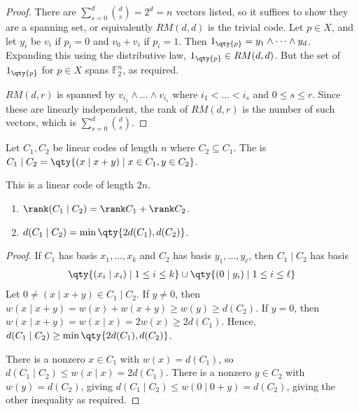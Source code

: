 \begin{proof}
    There are $\sum_{s=0}^d \binom{d}{s} = 2^d = n$ vectors listed, so it suffices to show they are a spanning set, or equivalently $RM(d,d)$ is the trivial code.
    Let $p \in X$, and let $y_i$ be $v_i$ if $p_i = 0$ and $v_0 + v_i$ if $p_i = 1$.
    Then $1_{\qty{p}} = y_1 \wedge \dots \wedge y_d$.
    Expanding this using the distributive law, $1_{\qty{p}} \in RM(d,d)$.
    But the set of $1_{\qty{p}}$ for $p \in X$ spans $\mathbb F_2^n$, as required.

    $RM(d,r)$ is spanned by $v_{i_1} \wedge \dots \wedge v_{i_s}$ where $i_1 < \dots < i_s$ and $0 \leq s \leq r$.
    Since these are linearly independent, the rank of $RM(d,r)$ is the number of such vectors, which is $\sum_{s=0}^d \binom{d}{s}$.
\end{proof}
\begin{definition}
    Let $C_1, C_2$ be linear codes of length $n$ where $C_2 \subseteq C_1$.
    The  is $C_1 \mid C_2 = \qty{(x \mid x + y) \mid x \in C_1, y \in C_2}$.
\end{definition}
This is a linear code of length $2n$.
\begin{lemma}
    \begin{enumerate}
        \item $\rank (C_1 \mid C_2) = \rank C_1 + \rank C_2$.
        \item $d(C_1 \mid C_2) = \min \qty{2d(C_1), d(C_2)}$.
    \end{enumerate}
\end{lemma}
\begin{proof}
    If $C_1$ has basis $x_1, \dots, x_k$ and $C_2$ has basis $y_1, \dots, y_\ell$, then $C_1 \mid C_2$ has basis
    \begin{align*}
        \qty{(x_i \mid x_i) \mid 1 \leq i \leq k} \cup \qty{(0 \mid y_i) \mid 1 \leq i \leq \ell}
    \end{align*}
    Let $0 \neq (x \mid x + y) \in C_1 \mid C_2$.
    If $y \neq 0$, then $w(x \mid x + y) = w(x) + w(x + y) \geq w(y) \geq d(C_2)$.
    If $y = 0$, then $w(x \mid x + y) = w(x \mid x) = 2w(x) \geq 2d(C_1)$.
    Hence, $d(C_1 \mid C_2) \geq \min\qty{2d(C_1), d(C_2)}$.

    There is a nonzero $x \in C_1$ with $w(x) = d(C_1)$, so $d(C_1 \mid C_2) \leq w(x \mid x) = 2d(C_1)$.
    There is a nonzero $y \in C_2$ with $w(y) = d(C_2)$, giving $d(C_1 \mid C_2) \leq w(0 \mid 0 + y) = d(C_2)$, giving the other inequality as required.
\end{proof}
